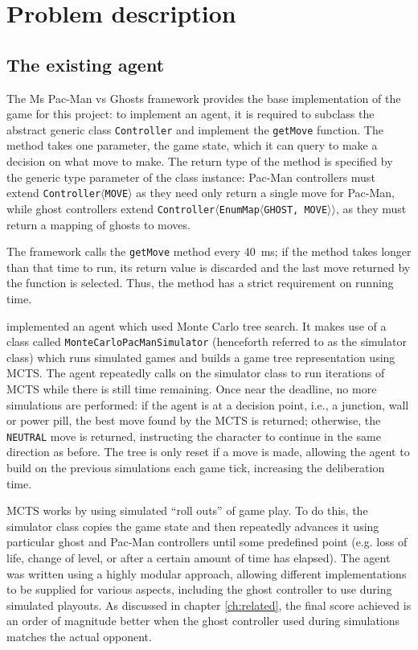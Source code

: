 \chapter{Problem description}
\label{ch:problem}

\section{The existing agent}

The Ms Pac-Man vs Ghosts framework provides the base implementation of the game for this project: to implement an agent, it is required to subclass the abstract generic class {\tt Controller} and implement the {\tt getMove} function.  The method takes one parameter, the game state, which it can query to make a decision on what move to make.  The return type of the method is specified by the generic type parameter of the class instance:  Pac-Man controllers must extend {\tt Controller{$\langle$}MOVE{$\rangle$}} as they need only return a single move for Pac-Man, while ghost controllers extend {\tt Controller{$\langle$}EnumMap{$\langle$}GHOST, MOVE{$\rangle\rangle$}}, as they must return a mapping of ghosts to moves.

The framework calls the {\tt getMove} method every 40~ms; if the method takes longer than that time to run, its return value is discarded and the last move returned by the function is selected.  Thus, the method has a strict requirement on running time.

\citet{Me2012} implemented an agent which used Monte Carlo tree search.  It makes use of a class called {\tt MonteCarloPacManSimulator} (henceforth referred to as the simulator class) which runs simulated games and builds a game tree representation using MCTS.  The agent repeatedly calls on the simulator class to run iterations of MCTS while there is still time remaining.  Once near the deadline, no more simulations are performed: if the agent is at a decision point, i.e., a junction, wall or power pill, the best move found by the MCTS is returned; otherwise, the {\tt NEUTRAL} move is returned, instructing the character to continue in the same direction as before.  The tree is only reset if a move is made, allowing the agent to build on the previous simulations each game tick, increasing the deliberation time.

MCTS works by using simulated ``roll outs'' of game play.  To do this, the simulator class copies the game state and then repeatedly advances it using particular ghost and Pac-Man controllers until some predefined point (e.g. loss of life, change of level, or after a certain amount of time has elapsed).  The agent was written using a highly modular approach, allowing different implementations to be supplied for various aspects, including the ghost controller to use during simulated playouts.  As discussed in chapter \ref{ch:related}, the final score achieved is an order of magnitude better when the ghost controller used during simulations matches the actual opponent.

